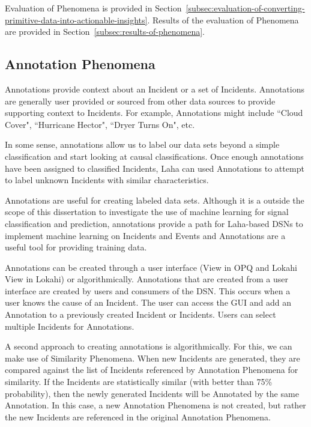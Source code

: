 Evaluation of Phenomena is provided in Section~\ref{subsec:evaluation-of-converting-primitive-data-into-actionable-insights}. Results of the evaluation of Phenomena are provided in Section~\ref{subsec:results-of-phenomena}.

\subsection{Annotation Phenomena}\label{subsec:annotations-phenomena}
Annotations provide context about an Incident or a set of Incidents. Annotations are generally user provided or sourced from other data sources to provide supporting context to Incidents. For example, Annotations might include ``Cloud Cover", ``Hurricane Hector", ``Dryer Turns On", etc.

In some sense, annotations allow us to label our data sets beyond a simple classification and start looking at causal classifications. Once enough annotations have been assigned to classified Incidents, Laha can used Annotations to attempt to label unknown Incidents with similar characteristics.

Annotations are useful for creating labeled data sets. Although it is a outside the scope of this dissertation to investigate the use of machine learning for signal classification and prediction, annotations provide a path for Laha-based DSNs to implement machine learning on Incidents and Events and Annotations are a useful tool for providing training data.

Annotations can be created through a user interface (View in OPQ and Lokahi View in Lokahi) or algorithmically. Annotations that are created from a user interface are created by users and consumers of the DSN. This occurs when a user knows the cause of an Incident. The user can access the GUI and add an Annotation to a previously created Incident or Incidents. Users can select multiple Incidents for Annotations.

A second approach to creating annotations is algorithmically. For this, we can make use of Similarity Phenomena. When new Incidents are generated, they are compared against the list of Incidents referenced by Annotation Phenomena for similarity. If the Incidents are statistically similar (with better than 75\% probability), then the newly generated Incidents will be Annotated by the same Annotation. In this case, a new Annotation Phenomena is not created, but rather the new Incidents are referenced in the original Annotation Phenomena.

